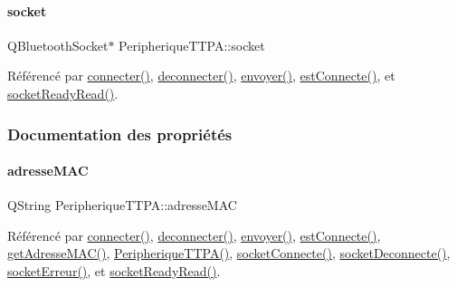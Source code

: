 \paragraph{\texorpdfstring{socket}{socket}}
{\footnotesize\ttfamily Q\+Bluetooth\+Socket$\ast$ Peripherique\+T\+T\+P\+A\+::socket\hspace{0.3cm}{\ttfamily [private]}}



Référencé par \hyperlink{class_peripherique_t_t_p_a_a8afa92f7c3ae6e1edc30f5c8b386af81}{connecter()}, \hyperlink{class_peripherique_t_t_p_a_a23bd4f409e6763022807d5b278464328}{deconnecter()}, \hyperlink{class_peripherique_t_t_p_a_a529048ac8be73560038bbeee0047b634}{envoyer()}, \hyperlink{class_peripherique_t_t_p_a_a33991b646ef2a49e79bac478b5f722c7}{est\+Connecte()}, et \hyperlink{class_peripherique_t_t_p_a_a4e1d676e59b293161a40ee6428a79871}{socket\+Ready\+Read()}.



\subsubsection{Documentation des propriétés}
\mbox{\label{class_peripherique_t_t_p_a_a444063230c83cf81eff8a3a55736f2cf}} 
\paragraph{\texorpdfstring{adresse\+M\+AC}{adresseMAC}}
{\footnotesize\ttfamily Q\+String Peripherique\+T\+T\+P\+A\+::adresse\+M\+AC\hspace{0.3cm}{\ttfamily [read]}}



Référencé par \hyperlink{class_peripherique_t_t_p_a_a8afa92f7c3ae6e1edc30f5c8b386af81}{connecter()}, \hyperlink{class_peripherique_t_t_p_a_a23bd4f409e6763022807d5b278464328}{deconnecter()}, \hyperlink{class_peripherique_t_t_p_a_a529048ac8be73560038bbeee0047b634}{envoyer()}, \hyperlink{class_peripherique_t_t_p_a_a33991b646ef2a49e79bac478b5f722c7}{est\+Connecte()}, \hyperlink{class_peripherique_t_t_p_a_a1e828514b4576a87295bb2d9a3d87876}{get\+Adresse\+M\+A\+C()}, \hyperlink{class_peripherique_t_t_p_a_acb4f39a3af94d61dcb673df11bed3a15}{Peripherique\+T\+T\+P\+A()}, \hyperlink{class_peripherique_t_t_p_a_aab23a43f5c9d70c30df3dbf4aeeeff9d}{socket\+Connecte()}, \hyperlink{class_peripherique_t_t_p_a_adb04c45864ea56a80a0716cde0a31856}{socket\+Deconnecte()}, \hyperlink{class_peripherique_t_t_p_a_a85811ace874ff7cea3437146511f1b2c}{socket\+Erreur()}, et \hyperlink{class_peripherique_t_t_p_a_a4e1d676e59b293161a40ee6428a79871}{socket\+Ready\+Read()}.

